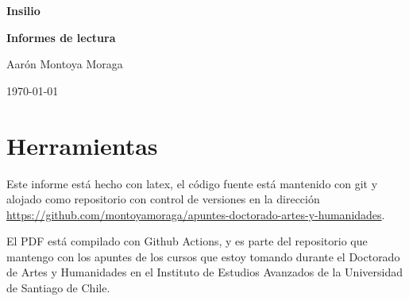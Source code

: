 \documentclass[10pt, openany]{report}
\begin{document}
\begin{titlepage}
	\centering
	\vspace{1cm}
	\vspace{1.5cm}
    \vfill
	{\huge\bfseries Insilio\par}
	{\large\bfseries Informes de lectura\par}
	\vspace{2cm}
	{\Large Aarón Montoya Moraga\par}
    \vfill
	{\large \today\par}
\end{titlepage}

\tableofcontents

\newpage

\chapter{Herramientas}

Este informe está hecho con \gls{latex}, el código fuente está mantenido con git y alojado como repositorio con control de versiones en la dirección \url{https://github.com/montoyamoraga/apuntes-doctorado-artes-y-humanidades}.

El PDF está compilado con Github Actions, y es parte del repositorio que mantengo con los apuntes de los cursos que estoy tomando durante el Doctorado de Artes y Humanidades en el Instituto de Estudios Avanzados de la Universidad de Santiago de Chile.

\newpage













\printglossaries
\end{document}
